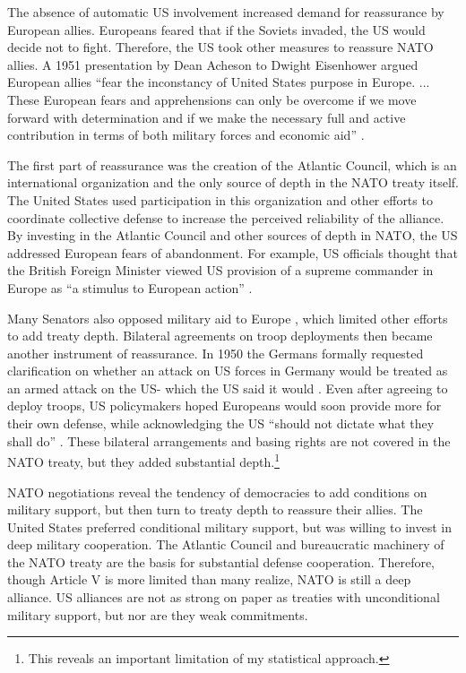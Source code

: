 \documentclass[12pt]{article}
\begin{document}
The absence of automatic US involvement increased demand for reassurance by European allies. 
Europeans feared that if the Soviets invaded, the US would decide not to fight. 
Therefore, the US took other measures to reassure NATO allies. 
A 1951 presentation by Dean Acheson to Dwight Eisenhower argued European allies ``fear the inconstancy of United States purpose in Europe. ... These European fears and apprehensions can only be overcome if we move forward with determination and if we make the necessary full and active contribution in terms of both military forces and economic aid'' \citep[pg. 3]{Acheson1951}. 


The first part of reassurance was the creation of the Atlantic Council, which is an international organization and the only source of depth in the NATO treaty itself. 
The United States used participation in this organization and other efforts to coordinate collective defense to increase the perceived reliability of the alliance. 
By investing in the Atlantic Council and other sources of depth in NATO, the US addressed European fears of abandonment. 
For example, US officials thought that the British Foreign Minister viewed US provision of a supreme commander in Europe as ``a stimulus to European action'' \citep{Acheson1950}. 


Many Senators also opposed military aid to Europe \citep[pg 285]{Acheson1969}, which limited other efforts to add treaty depth. 
Bilateral agreements on troop deployments then became another instrument of reassurance. 
In 1950 the Germans formally requested clarification on whether an attack on US forces in Germany would be treated as an armed attack on the US- which the US said it would \citep[pg. 395]{Acheson1969}.  
Even after agreeing to deploy troops, US policymakers hoped Europeans would soon provide more for their own defense, while acknowledging the US ``should not dictate what they shall do'' \citep[pg. 2]{Johnson1950}. 
These bilateral arrangements and basing rights are not covered in the NATO treaty, but they added substantial depth.\footnote{This reveals an important limitation of my statistical approach.}  


NATO negotiations reveal the tendency of democracies to add conditions on military support, but then turn to treaty depth to reassure their allies. 
The United States preferred conditional military support, but was willing to invest in deep military cooperation. 
The Atlantic Council and bureaucratic machinery of the NATO treaty are the basis for substantial defense cooperation. 
Therefore, though Article V is more limited than many realize, NATO is still a deep alliance. 
US alliances are not as strong on paper as treaties with unconditional military support, but nor are they weak commitments. 
\end{document}

